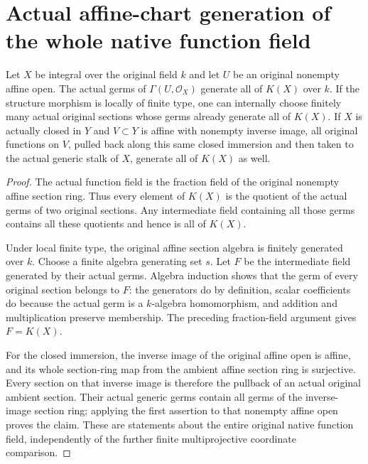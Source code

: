 \section{Actual affine-chart generation of the whole native function field}
\label{sec:affine-function-field-generation}

\begin{theorem}
\label{thm:affine-function-field-generation}
\leanok
{}
Let $X$ be integral over the original field $k$ and let $U$ be
an original nonempty affine open. The actual germs of
$\Gamma(U,\mathcal O_X)$ generate all of $K(X)$ over $k$.
If the structure morphism is locally of finite type, one
can internally choose finitely many actual original sections
whose germs already generate all of $K(X)$. If $X$ is actually
closed in $Y$ and $V\subset Y$ is affine with nonempty inverse
image, all original functions on $V$, pulled back along this
same closed immersion and then taken to the actual generic
stalk of $X$, generate all of $K(X)$ as well.
\end{theorem}

\begin{proof}
The actual function field is the fraction field of the
original nonempty affine section ring. Thus every element of
$K(X)$ is the quotient of the actual germs of two original
sections. Any intermediate field containing all those germs
contains all these quotients and hence is all of $K(X)$.

Under local finite type, the original affine section algebra
is finitely generated over $k$. Choose a finite algebra
generating set $s$. Let $F$ be the intermediate field generated
by their actual germs. Algebra induction shows that the germ
of every original section belongs to $F$: the generators do
by definition, scalar coefficients do because the actual germ
is a $k$-algebra homomorphism, and addition and multiplication
preserve membership. The preceding fraction-field argument
gives $F=K(X)$.

For the closed immersion, the inverse image of the original
affine open is affine, and its whole section-ring map from
the ambient affine section ring is surjective. Every section
on that inverse image is therefore the pullback of an actual
original ambient section. Their actual generic germs contain
all germs of the inverse-image section ring; applying the
first assertion to that nonempty affine open proves the claim.
These are statements about the entire original native function
field, independently of the further finite multiprojective
coordinate comparison.
\end{proof}
